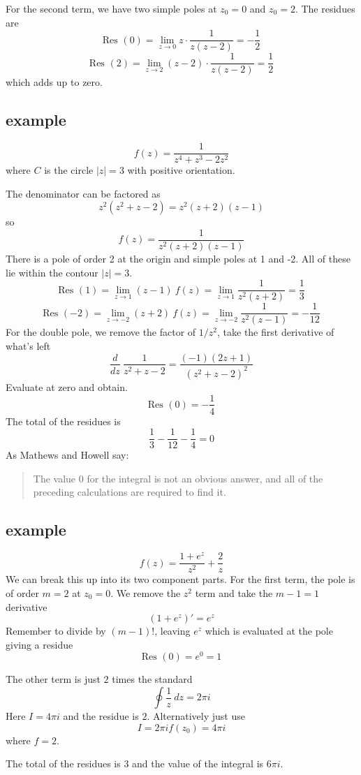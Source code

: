 \documentclass[11pt, oneside]{article}
\begin{document}
For the second term, we have two simple poles at $z_0=0$ and $z_0=2$.  The residues are
\[ \text{Res } (0) = \lim_{z \rightarrow 0} z \cdot \frac{1}{z(z-2)} = - \frac{1}{2} \]
\[ \text{Res } (2) = \lim_{z \rightarrow 2} (z-2) \cdot \frac{1}{z(z-2)} = \frac{1}{2} \]
which adds up to zero.

\subsection*{example}
\[ f(z) = \frac{1}{z^4 + z^3 - 2z^2} \]
where $C$ is the circle $|z| = 3$ with positive orientation.

The denominator can be factored as
\[ z^2(z^2 + z - 2) = z^2(z + 2)(z - 1) \]
so
\[ f(z) = \frac{1}{z^2(z + 2)(z - 1)} \]
There is a pole of order 2 at the origin and simple poles at 1 and -2.  All of these lie within the contour $|z| = 3$.
\[ \text{Res }(1) = \lim_{z \rightarrow 1} (z-1) \ f(z) = \lim_{z \rightarrow 1} \frac{1}{z^2 (z + 2)} = \frac{1}{3} \]
\[ \text{Res }(-2) = \lim_{z \rightarrow -2} (z+2) \ f(z) = \lim_{z \rightarrow -2} \frac{1}{z^2 (z - 1)} = -\frac{1}{12} \]
For the double pole, we remove the factor of $1/z^2$, take the first derivative of what's left
\[ \frac{d}{dz} \ \frac{1}{z^2 + z - 2} = \frac{(-1)(2z + 1)}{(z^2 + z - 2)^2} \]
Evaluate at zero and obtain.
\[ \text{Res }(0) = - \frac{1}{4} \]
The total of the residues is
\[ \frac{1}{3} -\frac{1}{12} - \frac{1}{4} = 0 \]
As Mathews and Howell say:
\begin{quote}The value 0 for the integral is not an obvious answer, and all of the preceding calculations are required to find it.\end{quote}

\subsection*{example}
\[ f(z) = \frac{1 + e^z}{z^2} + \frac{2}{z} \]
We can break this up into its two component parts.  For the first term, the pole is of order $m = 2$ at $z_0 = 0$.  We remove the $z^2$ term and take the $m-1 = 1$ derivative
\[ (1 + e^z)' = e^z \]
Remember to divide by $(m-1)!$, leaving $e^z$ which is evaluated at the pole giving a residue
\[ \text{Res }(0) = e^0 = 1 \]

The other term is just $2$ times the standard
\[ \oint \frac{1}{z} \ dz = 2 \pi i \]
Here $I = 4 \pi i$ and the residue is $2$.  Alternatively just use
\[ I = 2 \pi i f(z_0) = 4 \pi i \]
where $f = 2$.

The total of the residues is $3$ and the value of the integral is $6 \pi i$.
\end{document}
